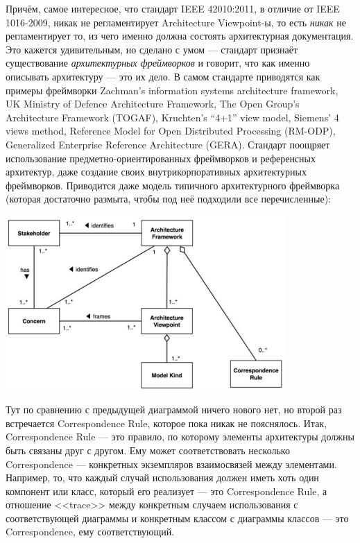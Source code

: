 \documentclass{../mcstext}
\begin{document}
Причём, самое интересное, что стандарт IEEE 42010:2011, в отличие от IEEE 1016-2009, никак не регламентирует Architecture Viewpoint-ы, то есть \emph{никак} не регламентирует то, из чего именно должна состоять архитектурная документация. Это кажется удивительным, но сделано с умом --- стандарт признаёт существование \emph{архитектурных фреймворков} и говорит, что как именно описывать архитектуру --- это их дело. В самом стандарте приводятся как примеры фреймворки Zachman’s information systems architecture framework, UK Ministry of Defence Architecture Framework, The Open Group’s Architecture Framework (TOGAF), Kruchten’s ``4+1'' view model, Siemens’ 4 views method, Reference Model for Open Distributed Processing (RM-ODP), Generalized Enterprise Reference Architecture (GERA). Стандарт поощряет использование предметно-ориентированных фреймворков и референсных архитектур, даже создание своих внутрикорпоративных архитектурных фреймворков. Приводится даже модель типичного архитектурного фреймворка (которая достаточно размыта, чтобы под неё подходили все перечисленные):

\begin{center}
    \includegraphics[width=0.8\textwidth]{ieee42010ArchitectureFramework.png}
\end{center}

Тут по сравнению с предыдущей диаграммой ничего нового нет, но второй раз встречается Correspondence Rule, которое пока никак не пояснялось. Итак, Correspondence Rule --- это правило, по которому элементы архитектуры должны быть связаны друг с другом. Ему может соответствовать несколько Correspondence --- конкретных экземпляров взаимосвязей между элементами. Например, то, что каждый случай использования должен иметь хоть один компонент или класс, который его реализует --- это Correspondence Rule, а отношение <<trace>> между конкретным случаем использования с соответствующей диаграммы и конкретным классом с диаграммы классов --- это Correspondence, ему соответствующий.
\end{document}
